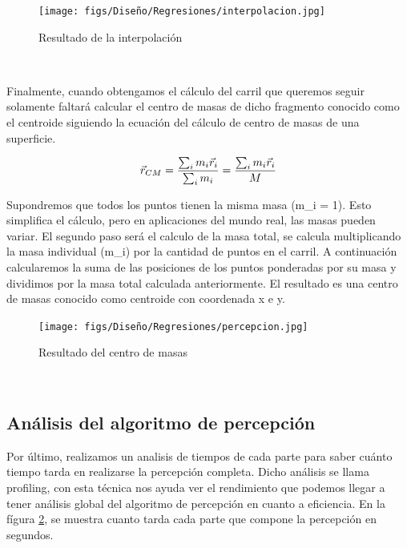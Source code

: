   \begin{figure} [H]
    \begin{center}
      \texttt{[image: figs/Diseño/Regresiones/interpolacion.jpg]}
    \end{center}
    \caption{Resultado de la interpolación}
    \label{fig:interpolación}
  \end{figure}\

  Finalmente, cuando obtengamos el cálculo del carril que queremos seguir solamente faltará calcular el centro de masas de dicho fragmento conocido como el centroide siguiendo la ecuación
  del cálculo de centro de masas de una superficie. \newline

  \begin{equation} 
    \vec{r}_{CM} = \frac{\sum_{i}m_{i} \vec{r}_{i}}{\sum_{i}m_{i}} = \frac{\sum_{i}m_{i} \vec{r}_{i}}{M} 
    \newline
  \end{equation} 
 
  Supondremos que todos los puntos tienen la misma masa (m\_i = 1). Esto simplifica el cálculo, pero en aplicaciones del mundo real, las masas pueden variar.
  El segundo paso será el calculo de la masa total, se calcula multiplicando la masa individual (m\_i) por la cantidad de puntos en el carril. A continuación calcularemos
  la suma de las posiciones de los puntos ponderadas por su masa y dividimos por la masa total calculada anteriormente. El resultado es una centro de masas conocido como centroide
  con coordenada x e y. 

  \begin{figure} [H]
    \begin{center}
      \texttt{[image: figs/Diseño/Regresiones/percepcion.jpg]}
    \end{center}
    \caption{Resultado del centro de masas}
    \label{fig:centro de masas}
  \end{figure}\

  \subsection{Análisis del algoritmo de percepción}
  \label{sec:Análisis del algoritmo de percepción}
  Por último, realizamos un analisis de tiempos de cada parte para saber cuánto tiempo tarda en realizarse la percepción completa. Dicho análisis se llama profiling, con esta técnica 
  nos ayuda ver el rendimiento que podemos llegar a tener análisis global del algoritmo de percepción en cuanto a eficiencia. En la fígura \ref{fig:centro de masas}, 
  se muestra cuanto tarda cada parte que compone la percepción en segundos.


